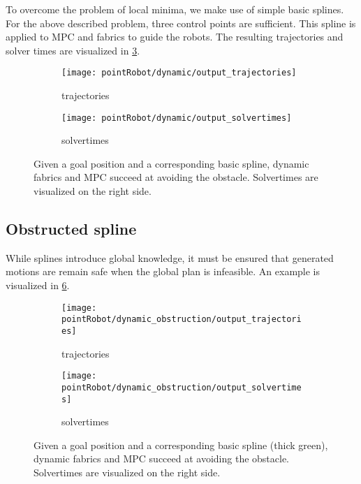 To overcome the problem of local minima, we make use of simple basic splines. For the
above described problem, three control points are sufficient.
This spline is applied to MPC and fabrics to guide the robots. The resulting trajectories
and solver times are visualized in \cref{fig:pointRobot_dynamic}.
\begin{figure}
  \begin{subfigure}[]{0.5\textwidth}
  \begin{center}
    \texttt{[image: pointRobot/dynamic/output\_trajectories]}
  \end{center}
  \caption{trajectories}
  \label{fig:pointRobot_dynamic_trajectories}
  \end{subfigure}%
  \begin{subfigure}[]{0.5\textwidth}
  \begin{center}
    \texttt{[image: pointRobot/dynamic/output\_solvertimes]}
  \end{center}
  \caption{solvertimes}
  \label{fig:pointRobot_dynamic_solvertimes}
  \end{subfigure}
  \caption{Given a goal position and a corresponding basic spline, dynamic fabrics and MPC
succeed at avoiding the obstacle. Solvertimes are visualized on the right side.}%
  \label{fig:pointRobot_dynamic}
\end{figure}

\subsection{Obstructed spline}%
\label{sub:obstructed_spline}

While splines introduce global knowledge, it must be ensured that generated motions are
remain safe when the global plan is infeasible. An example is visualized in
\cref{fig:pointRobot_dynamic_obstruction}.
\begin{figure}
  \begin{subfigure}[]{0.5\textwidth}
  \begin{center}
    \texttt{[image: pointRobot/dynamic\_obstruction/output\_trajectories]}
  \end{center}
  \caption{trajectories}
  \label{fig:pointRobot_dynamic_obstruction_trajectories}
  \end{subfigure}%
  \begin{subfigure}[]{0.5\textwidth}
  \begin{center}
    \texttt{[image: pointRobot/dynamic\_obstruction/output\_solvertimes]}
  \end{center}
  \caption{solvertimes}
  \label{fig:pointRobot_dynami_obstructionc_solvertimes}
  \end{subfigure}
  \caption{Given a goal position and a corresponding basic spline (thick green), dynamic fabrics and MPC
succeed at avoiding the obstacle. Solvertimes are visualized on the right side.}%
  \label{fig:pointRobot_dynamic_obstruction}
\end{figure}





